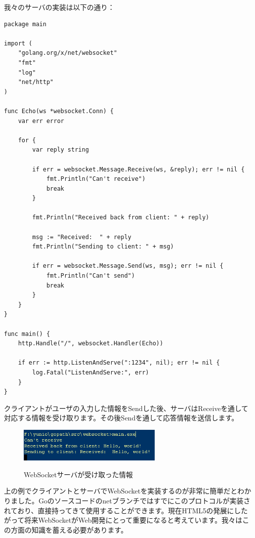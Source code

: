 我々のサーバの実装は以下の通り：

\begin{lstlisting}[numbers=none]
package main

import (
    "golang.org/x/net/websocket"
    "fmt"
    "log"
    "net/http"
)

func Echo(ws *websocket.Conn) {
    var err error

    for {
        var reply string

        if err = websocket.Message.Receive(ws, &reply); err != nil {
            fmt.Println("Can't receive")
            break
        }

        fmt.Println("Received back from client: " + reply)

        msg := "Received:  " + reply
        fmt.Println("Sending to client: " + msg)

        if err = websocket.Message.Send(ws, msg); err != nil {
            fmt.Println("Can't send")
            break
        }
    }
}

func main() {
    http.Handle("/", websocket.Handler(Echo))

    if err := http.ListenAndServe(":1234", nil); err != nil {
        log.Fatal("ListenAndServe:", err)
    }
}
\end{lstlisting}

クライアントがユーザの入力した情報をSendした後、サーバはReceiveを通して対応する情報を受け取ります。その後Sendを通して応答情報を送信します。

\begin{figure}[H]
  \includegraphics[width=7cm]{8.2.websocket3.png}
   \label{図8.4}
   \caption{WebSocketサーバが受け取った情報}
\end{figure}

上の例でクライアントとサーバでWebSocketを実装するのが非常に簡単だとわかりました。Goのソースコードのnetブランチではすでにこのプロトコルが実装されており、直接持ってきて使用することができます。現在HTML5の発展にしたがって将来WebSocketがWeb開発にとって重要になると考えています。我々はこの方面の知識を蓄える必要があります。


